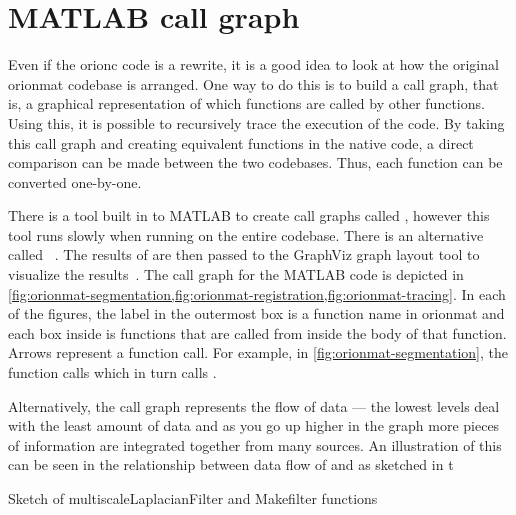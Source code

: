 \section{ MATLAB call graph}\label{appx:matlab-call-graph}

Even if the \gls{orionc} code is a rewrite, it is a good idea to look at how
the original \gls{orionmat} codebase is arranged.  One way to do this is to
build a call graph, that is, a graphical representation of which functions are
called by other functions. Using this, it is possible to recursively trace the
execution of the code. By taking this call graph and creating equivalent
functions in the native code, a direct comparison can be made between the two
codebases. Thus, each function can be converted one-by-one.

There is a tool built in to MATLAB to create call graphs called
, %
however this tool runs slowly when running on the entire codebase.
There is an alternative called ~\autocite{MATLAB:fdep}. The
results of  are then passed to the GraphViz graph layout
tool to visualize the results~\autocite{GraphViz:Gansner:2000}.
The call graph for the MATLAB code is depicted in \cref{fig:orionmat-segmentation,fig:orionmat-registration,fig:orionmat-tracing}.
In each of the figures, the label in the outermost box is a function name in
\gls{orionmat} and each box inside is functions that are called from inside the
body of that function. Arrows represent a function call. For example, in
\cref{fig:orionmat-segmentation}, the 
function calls  which in turn calls
.

Alternatively, the call graph represents the flow of data --- the lowest levels
deal with the least amount of data and as you go up higher in the graph more
pieces of information are integrated together from many sources.
An illustration of this can be seen in the relationship between 
data flow of  and  as sketched in t %
\begin{algorithm}
	\caption{Sketch of multiscaleLaplacianFilter and Makefilter functions}\label{alg:dataflow_example}
	\begin{algorithmic}[1]
		\EndProcedure
			\EndFor
		\EndProcedure
	\end{algorithmic}
\end{algorithm}

